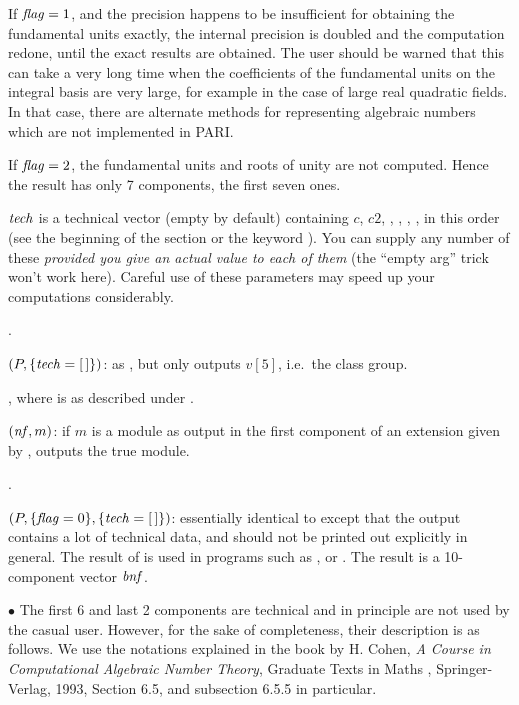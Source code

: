 If $\hbox{\it f\kern0pt lag\/}=1$, and the precision happens to be insufficient for obtaining the
fundamental units exactly, the internal precision is doubled and the
computation redone, until the exact results are obtained. The user should be
warned that this can take a very long time when the coefficients of the
fundamental units on the integral basis are very large, for example in the
case of large real quadratic fields. In that case, there are alternate
methods for representing algebraic numbers which are not implemented in PARI.

If $\hbox{\it f\kern0pt lag\/}=2$, the fundamental units and roots of unity are not computed.
Hence the result has only 7 components, the first seven ones.

$\hbox{\it tech\/}$ is a technical vector (empty by default) containing $c$, $c2$,
, , , , in this order (see
the beginning of the section or the keyword ).
You can supply any number of these \emph{provided you give an actual value to
each of them} (the ``empty arg'' trick won't work here). Careful use of these
parameters may speed up your computations considerably.

.

$(P,\{\hbox{\it tech\/}=[\,]\})$: as , but only
outputs $v[5]$, i.e.~the class group.

, where 
is as described under .

$(\hbox{\it nf\/},m)$: if $m$ is a module as output in the
first component of an extension given by , outputs the
true module.

.

$(P,\{\hbox{\it f\kern0pt lag\/}=0\},\{\hbox{\it tech\/}=[\,]\})$: essentially identical
to  except that the output contains a lot of technical data,
and should not be printed out explicitly in general. The result of
 is used in programs such as ,
 or . The result is a 10-component vector
$\hbox{\it bnf\/}$.

\noindent $\bullet$ The first 6 and last 2 components are technical and in
principle are not used by the casual user. However, for the sake of
completeness, their description is as follows. We use the notations explained
in the book by H. Cohen, \emph{A Course in Computational Algebraic Number
Theory}, Graduate Texts in Maths , Springer-Verlag, 1993, Section
6.5, and subsection 6.5.5 in particular.

